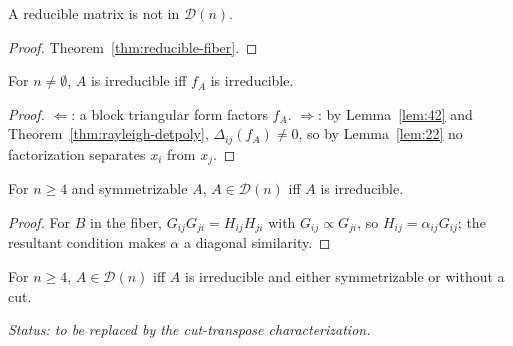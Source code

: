 \begin{corollary}
\label{cor:reducible-not-trivial}
\leanok
{}
A reducible matrix is not in $\mathcal D(n)$.
\end{corollary}

\begin{proof}
\leanok
{}
Theorem~\ref{thm:reducible-fiber}.
\end{proof}

\begin{lemma}
\label{lem:51}
\leanok
{}
For $n\ne\emptyset$, $A$ is irreducible iff $f_A$ is irreducible.
\end{lemma}

\begin{proof}
$\Leftarrow$: a block triangular form factors $f_A$. $\Rightarrow$: by Lemma~\ref{lem:42} and
Theorem~\ref{thm:rayleigh-detpoly}, $\Delta_{ij}(f_A)\ne0$, so by Lemma~\ref{lem:22} no
factorization separates $x_i$ from $x_j$.
\end{proof}

\begin{lemma}
\label{lem:61}
\leanok
{}
For $n\ge4$ and symmetrizable $A$, $A\in\mathcal D(n)$ iff $A$ is irreducible.
\end{lemma}

\begin{proof}
For $B$ in the fiber, $G_{ij}G_{ji}=H_{ij}H_{ji}$ with $G_{ij}\propto G_{ji}$, so
$H_{ij}=\alpha_{ij}G_{ij}$; the resultant condition makes $\alpha$ a diagonal similarity.
\end{proof}

\begin{theorem}
\label{thm:41}
\leanok
{}
For $n\ge4$, $A\in\mathcal D(n)$ iff $A$ is irreducible and either symmetrizable or without a
cut.
\end{theorem}

\noindent\emph{Status: to be replaced by the cut-transpose
characterization.}

